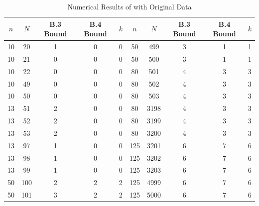 \documentclass[12pt]{article}
\begin{document}
\begin{table}[htbp]
    \centering
    \begin{tabular}{ccccc|ccccc}
        \toprule
        $n$ & $N$ & B.3 Bound & B.4 Bound & $k$ & $n$ & $N$ & B.3 Bound & B.4 Bound & $k$ \\
        \midrule
        10 & 20 & 1 & 0 & 0 & 50 & 499 & 3 & 1 & 1 \\
        10 & 21 & 0 & 0 & 0 & 50 & 500 & 3 & 1 & 1 \\
        10 & 22 & 0 & 0 & 0 & 80 & 501 & 4 & 3 & 3 \\
        10 & 49 & 0 & 0 & 0 & 80 & 502 & 4 & 3 & 3 \\
        10 & 50 & 0 & 0 & 0 & 80 & 503 & 4 & 3 & 3 \\
        13 & 51 & 2 & 0 & 0 & 80 & 3198 & 4 & 3 & 3 \\
        13 & 52 & 2 & 0 & 0 & 80 & 3199 & 4 & 3 & 3 \\
        13 & 53 & 2 & 0 & 0 & 80 & 3200 & 4 & 3 & 3 \\
        13 & 97 & 1 & 0 & 0 & 125 & 3201 & 6 & 7 & 6 \\
        13 & 98 & 1 & 0 & 0 & 125 & 3202 & 6 & 7 & 6 \\
        13 & 99 & 1 & 0 & 0 & 125 & 3203 & 6 & 7 & 6 \\
        50 & 100 & 2 & 2 & 2 & 125 & 4999 & 6 & 7 & 6 \\
        50 & 101 & 3 & 2 & 2 & 125 & 5000 & 6 & 7 & 6 \\
        \bottomrule
    \end{tabular}
    \caption{Numerical Results of \cite{JJF2005} with Original Data}
\end{table}
\end{document}
